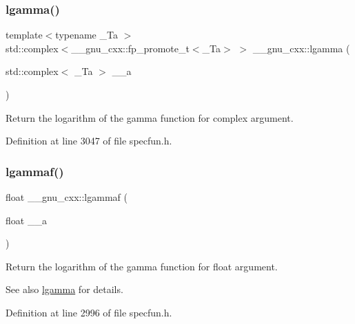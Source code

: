 \subsubsection{\texorpdfstring{lgamma()}{lgamma()}\hspace{0.1cm}{\footnotesize\ttfamily [2/2]}}
{\footnotesize\ttfamily template$<$typename \+\_\+\+Ta $>$ \\
std\+::complex$<$\+\_\+\+\_\+gnu\+\_\+cxx\+::fp\+\_\+promote\+\_\+t$<$\+\_\+\+Ta$>$ $>$ \+\_\+\+\_\+gnu\+\_\+cxx\+::lgamma (\begin{DoxyParamCaption}\item[{std\+::complex$<$ \+\_\+\+Ta $>$}]{\+\_\+\+\_\+a }\end{DoxyParamCaption})\hspace{0.3cm}{\ttfamily [inline]}}

Return the logarithm of the gamma function for complex argument. 

Definition at line 3047 of file specfun.\+h.

\mbox{\label{group__gnu__math__spec__func_ga37956b360838b5b2f98c8e5cfd15d307}} 
\subsubsection{\texorpdfstring{lgammaf()}{lgammaf()}\hspace{0.1cm}{\footnotesize\ttfamily [1/2]}}
{\footnotesize\ttfamily float \+\_\+\+\_\+gnu\+\_\+cxx\+::lgammaf (\begin{DoxyParamCaption}\item[{float}]{\+\_\+\+\_\+a }\end{DoxyParamCaption})\hspace{0.3cm}{\ttfamily [inline]}}

Return the logarithm of the gamma function for {\ttfamily  float } argument.

\begin{DoxySeeAlso}{See also}
\hyperlink{group__gnu__math__spec__func_ga40fa5127f7c419ed1d8f1c6a6f96ea9b}{lgamma} for details. 
\end{DoxySeeAlso}


Definition at line 2996 of file specfun.\+h.


